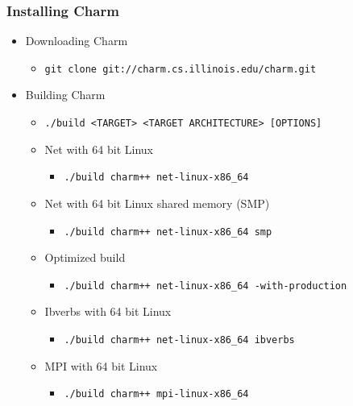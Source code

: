 \begin{frame}
  \frametitle{Installing Charm}
  \begin{itemize}
    \item Downloading Charm
    \begin{itemize}
      \item \texttt{git clone git://charm.cs.illinois.edu/charm.git}
    \end{itemize}
    \item Building Charm
    \begin{itemize}
      \item \texttt{./build <TARGET> <TARGET ARCHITECTURE> [OPTIONS]}
      \item Net with 64 bit Linux 
      \begin{itemize}
        \item \texttt{./build charm++ net-linux-x86\_64}
      \end{itemize}
      \item Net with 64 bit Linux shared memory (SMP)
      \begin{itemize}
        \item \texttt{./build charm++ net-linux-x86\_64 smp}
      \end{itemize}
      \item Optimized build
      \begin{itemize}
        \item \texttt{./build charm++ net-linux-x86\_64 -with-production}
      \end{itemize}
      \item Ibverbs with 64 bit Linux 
      \begin{itemize}
        \item \texttt{./build charm++ net-linux-x86\_64 ibverbs}
      \end{itemize}
      \item MPI with 64 bit Linux
      \begin{itemize}
        \item \texttt{./build charm++ mpi-linux-x86\_64}
      \end{itemize}
    \end{itemize}
  \end{itemize}
\end{frame}

